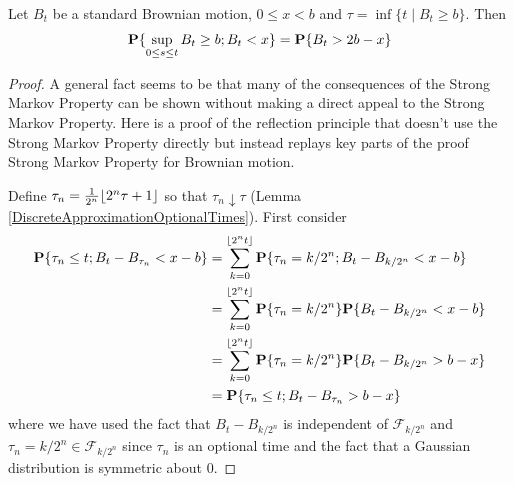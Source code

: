 \begin{lem}Let $B_t$ be a standard Brownian motion, $0 \leq x < b$ and
  $\tau = \inf \lbrace t \mid B_t \geq b\rbrace$.  Then 
\begin{align*}
\textbf{P}\{\sup_{0 \leq s \leq t} B_t \geq b ; B_t < x\} =
\textbf{P}\{B_t > 2b - x \}
\end{align*}
\end{lem}
\begin{proof}
A general fact seems to be that many of the consequences of the Strong
Markov Property can be shown without making a direct appeal to the
Strong Markov Property.  Here is a proof of the reflection principle that doesn't use the
Strong Markov Property directly but instead replays key parts of the proof
Strong Markov Property for Brownian motion.

Define 
$\tau_n = \frac{1}{2^n}
\lfloor 2^n \tau + 1 \rfloor$ so that $\tau_n \downarrow \tau$ (Lemma
\ref{DiscreteApproximationOptionalTimes}).  First consider
\begin{align*}
\textbf{P}\{\tau_n \leq t; B_t - B_{\tau_n} < x - b\} &=
\sum_{k=0}^{\lfloor 2^n t \rfloor} \textbf{P}\{\tau_n = k/2^n; B_t -
  B_{k/2^n} < x - b\} \\
&= \sum_{k=0}^{\lfloor 2^n t \rfloor} \textbf{P}\{\tau_n = k/2^n\} \textbf{P}\{ B_t -
  B_{k/2^n} < x - b\} \\
&= \sum_{k=0}^{\lfloor 2^n t \rfloor} \textbf{P}\{\tau_n = k/2^n\} \textbf{P}\{ 
B_t -  B_{k/2^n} > b - x\} \\
&= \textbf{P}\{\tau_n \leq t ;
  B_{t} - B_{\tau_n} > b - x\} \\
\end{align*}
where we have used the fact that $B_t - B_{k/2^n}$ is independent of
$\mathcal{F}_{k/2^n}$ and $\tau_n = k/2^n \in \mathcal{F}_{k/2^n}$
since $\tau_n$ is an optional time and the fact that a Gaussian
distribution is symmetric about $0$.


\end{proof}
